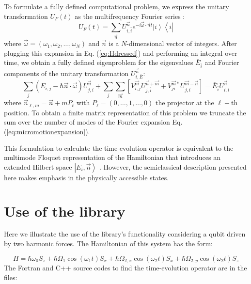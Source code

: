 \documentclass[10pt,a4paper]{article}
\begin{document}
To formulate a fully defined computational problem, we express the unitary transformation $U_F(t)$ as the multifrequency Fourier series \cite{ho1983semiclassical}:
\begin{equation}
U_F(t) = \sum_{\vec{n}} U_{i,\bar{i}}^{\vec{n}} e^{-i\vec{\omega} \cdot \vec{n}t} \left| i \right\rangle \left\langle \bar{i} \right|
\label{eq:micromotionexpansion}
\end{equation}
where $\vec{\omega} = (\omega_1,\omega_2,\ldots,\omega_N)$ and $\vec{n}$ is a $N$-dimensional vector of integers. After plugging this expansion in Eq. (\ref{eq:Hdressed}) and performing an integral over time, we obtain a fully defined eigenproblem for the eigenvalues $\bar{E}_{\bar{i}}$ and Fourier components of the unitary transformation $U_{i,\bar{E}}^{\vec{n}}$:
\begin{equation}
\sum_j(E_{i,j} - \hbar \vec{n} \cdot \vec{\omega})U^{\vec{n}}_{j,\bar{i}} + \sum_{j} \sum_{\vec{m}} \left[ V^{\vec{m}}_{i,j} U^{\vec{n}+\vec{m}}_{j,\bar{i}} + V^{\vec{m}*}_{ji} U^{\vec{m}-\vec{n}}_{j,\bar{i}}\right] = \bar{E}_{\bar{i}}U^{\vec{n}}_{i,\bar{i}}
\label{eq:multimodeeigenproblem}
\end{equation}
where $\vec{n}_{\ell,m} = \vec{n} + m P_{\ell}$ with $P_{\ell} = (0,\ldots, 1, \ldots,0)$ the projector at the $\ell-$th position. To obtain a finite matrix representation of this problem we truncate the sum over the number of modes of the Fourier expansion Eq. (\ref{eq:micromotionexpansion}). 

This formulation to calculate the time-evolution operator is equivalent to the multimode Floquet representation of the Hamiltonian that introduces an extended Hilbert space $\left| E_i,\vec{n} \right\rangle$  \cite{ho1983semiclassical,verdeny2016quasi}. However, the semiclassical description presented here makes emphasis in the physically accessible states. 


\section{Use of the library}

Here we illustrate the use of the library's functionality considering a qubit driven by two harmonic forces.  The Hamiltonian of this system has the form:

\begin{equation}
H = \hbar \omega_0 S_z + \hbar \Omega_1 \cos(\omega_1 t) S_x + \hbar \Omega_{2,x} \cos(\omega_2 t) S_x + \hbar \Omega_{2,y} \cos(\omega_2 t)  S_z
\label{eq:dressedqubitmodel}
\end{equation}
The Fortran and C++ source codes to find the time-evolution operator are in the files:
\end{document}
